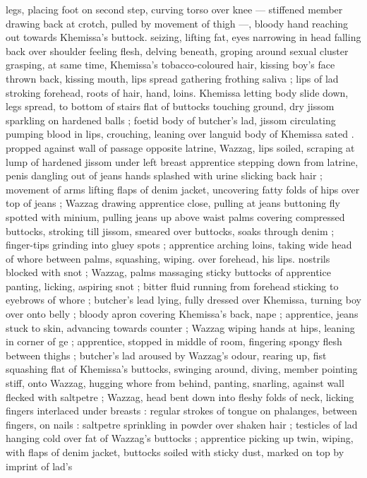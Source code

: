 legs, placing foot on second step, curving torso over knee ---
stiffened member drawing back at crotch, pulled by movement of
thigh ---, bloody hand reaching out towards Khemissa’s buttock.
seizing, lifting fat, eyes narrowing in head falling back over shoulder
feeling flesh, delving beneath, groping around sexual cluster
grasping, at same time, Khemissa's tobacco-coloured hair, kissing
boy's face thrown back, kissing mouth, lips spread gathering frothing
saliva ; lips of lad stroking forehead, roots of hair, hand, loins.
Khemissa letting body slide down, legs spread, to bottom of stairs
flat of buttocks touching ground, dry jissom sparkling on hardened
balls ; foetid body of butcher's lad, jissom circulating pumping blood
in lips, crouching, leaning over languid body of Khemissa sated .
propped against wall of passage opposite latrine, Wazzag, lips
soiled, scraping at lump of hardened jissom under left breast
apprentice stepping down from latrine, penis dangling out of jeans
hands splashed with urine slicking back hair ; movement of arms
lifting flaps of denim jacket, uncovering fatty folds of hips over top
of jeans ; Wazzag drawing apprentice close, pulling at jeans
buttoning fly spotted with minium, pulling jeans up above waist
palms covering compressed buttocks, stroking till jissom, smeared
over buttocks, soaks through denim ; finger-tips grinding into gluey
spots ; apprentice arching loins, taking wide head of whore between
palms, squashing, wiping. over forehead, his lips. nostrils blocked
with snot ; Wazzag, palms massaging sticky buttocks of apprentice
panting, licking, aspiring snot ; bitter fluid running from forehead
sticking to eyebrows of whore ; butcher's lead lying, fully dressed
over Khemissa, turning boy over onto belly ; bloody apron covering
Khemissa’s back, nape ; apprentice, jeans stuck to skin, advancing
towards counter ; Wazzag wiping hands at hips, leaning in corner of
ge ; apprentice, stopped in middle of room, fingering spongy
flesh between thighs ; butcher's lad aroused by Wazzag's odour,
rearing up, fist squashing flat of Khemissa’s buttocks, swinging
around, diving, member pointing stiff, onto Wazzag, hugging whore
from behind, panting, snarling, against wall flecked with saltpetre ;
Wazzag, head bent down into fleshy folds of neck, licking fingers
interlaced under breasts : regular strokes of tongue on phalanges,
between fingers, on nails : saltpetre sprinkling in powder over shaken
hair ; testicles of lad hanging cold over fat of Wazzag's buttocks ;
apprentice picking up twin, wiping, with flaps of denim jacket,
buttocks soiled with sticky dust, marked on top by imprint of lad’s
